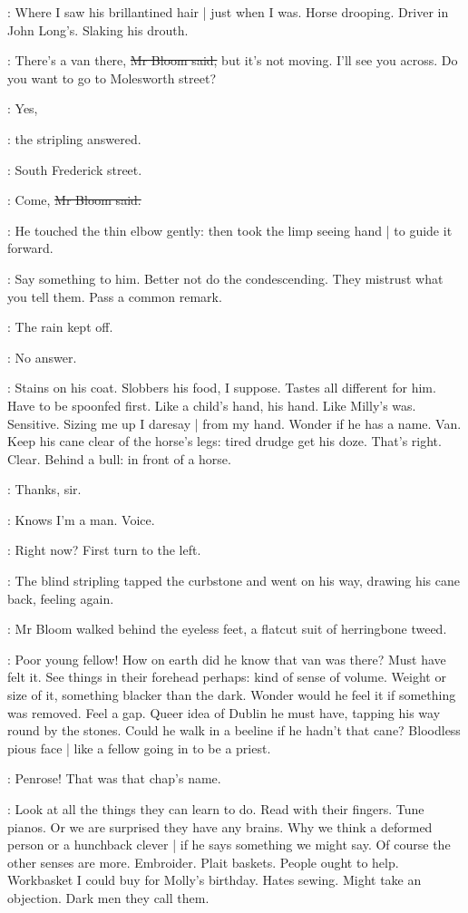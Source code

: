 \BloomInt:
Where I saw his brillantined hair |
just when I was.
Horse drooping.
Driver in John Long's.
Slaking his drouth.

\Bloom:
There's a van there,
\sout{Mr Bloom said,}
but it's not moving.
I'll see you across.
Do you want to go to Molesworth street?

\stripling:
Yes,

:
the stripling answered.

\stripling:
South Frederick street.

\Bloom:
Come,
\sout{Mr Bloom said.}

:
He touched the thin elbow gently:
then took the limp seeing hand |
to guide it forward.

\BloomInt:
Say something to him.
Better not do the condescending.
They mistrust what you tell them.
Pass a common remark.

\Bloom:
The rain kept off.

\BloomInt:
No answer.

\BloomInt:
Stains on his coat.
Slobbers his food, I suppose.
Tastes all different for him.
Have to be spoonfed first.
Like a child's hand, his hand.
Like Milly's was.
Sensitive.
Sizing me up I daresay |
from my hand.
Wonder if he has a name.
Van.
Keep his cane clear of the horse's legs:
tired drudge get his doze.
That's right.
Clear.
Behind a bull:
in front of a horse.

\stripling:
Thanks, sir.

\BloomInt:
Knows I'm a man.
Voice.

\Bloom:
Right now?
First turn to the left.

:
The blind stripling tapped the curbstone and went on his way,
drawing his cane back,
feeling again.

:
Mr Bloom walked behind the eyeless feet,
a flatcut suit of herringbone tweed.

\BloomInt:
Poor young fellow!
How on earth did he know that van was there?
Must have felt it.
See things in their forehead perhaps:
kind of sense of volume.
Weight or size of it,
something blacker than the dark.
Wonder would he feel it
if something was removed.
Feel a gap.
Queer idea of Dublin he must have,
tapping his way round by the stones.
Could he walk in a beeline
if he hadn't that cane?
Bloodless pious face |
like a fellow going in to be a priest.

\BloomInt:
Penrose!
That was that chap's name.

\BloomInt:
Look at all the things they can learn to do.
Read with their fingers.
Tune pianos.
Or we are surprised they have any brains.
Why we think a deformed person or a hunchback clever |
if he says something we might say.
Of course the other senses are more.
Embroider.
Plait baskets.
People ought to help.
Workbasket I could buy for Molly's birthday.
Hates sewing.
Might take an objection.
Dark men they call them.

